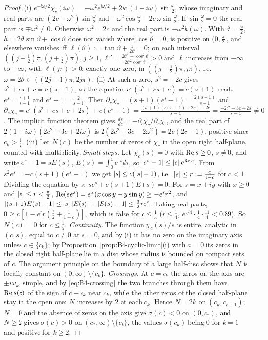 \begin{proof}
(i) $e^{-i\omega/2}\chi_c(i\omega)=-\omega^2e^{i\omega/2}+2ic\,(1+i\omega)\sin\frac\omega2$, whose imaginary and real parts are $(2c-\omega^2)\sin\frac\omega2$ and $-\omega^2\cos\frac\omega2-2c\,\omega\sin\frac\omega2$. If $\sin\frac\omega2=0$ the real part is $\mp\omega^2\ne0$. Otherwise $\omega^2=2c$ and the real part is $-\omega^2h(\omega)$. With $\vartheta=\frac\omega2$, $h=2\vartheta\sin\vartheta+\cos\vartheta$ does not vanish where $\cos\vartheta=0$, is positive on $(0,\frac\pi2]$, and elsewhere vanishes iff $\ell(\vartheta):=\tan\vartheta+\frac1{2\vartheta}=0$; on each interval $((j-\frac12)\pi,(j+\frac12)\pi)$, $j\ge1$, $\ell'=\frac{2\vartheta^2-\cos^2\vartheta}{2\vartheta^2\cos^2\vartheta}>0$ and $\ell$ increases from $-\infty$ to $+\infty$, with $\ell(j\pi)>0$: exactly one zero, in $((j-\frac12)\pi,j\pi)$, i.e.\ $\omega=2\vartheta\in((2j-1)\pi,2j\pi)$.
(ii) At such a zero, $s^2=-2c$ gives $s^2+cs+c=c(s-1)$, so the equation $e^s(s^2+cs+c)=c(s+1)$ reads $e^s=\frac{s+1}{s-1}$ and $e^s-1=\frac2{s-1}$. Then $\partial_c\chi_c=(s+1)(e^s-1)=\frac{2(s+1)}{s-1}$ and $\partial_s\chi_c=e^s(s^2+cs+c+2s)+c(e^s-1)=\frac{(s+1)(c(s-1)+2s)+2c}{s-1}=\frac{-2c^2-3c+2s}{s-1}\ne0$. The implicit function theorem gives $\frac{ds}{dc}=-\partial_c\chi_c/\partial_s\chi_c$, and the real part of $2(1+i\omega)(2c^2+3c+2i\omega)$ is $2(2c^2+3c-2\omega^2)=2c(2c-1)$, positive since $c_k>\frac12$.
(iii) Let $N(c)$ be the number of zeros of $\chi_c$ in the open right half-plane, counted with multiplicity. \emph{Small steps.} Let $\chi_c(s)=0$ with $\operatorname{Re} s\ge0$, $s\ne0$, and write $e^s-1=sE(s)$, $E(s)=\int_0^1e^{\tau s}d\tau$, so $\left|e^s-1\right|\le\left|s\right|e^{\operatorname{Re} s}$. From $s^2e^s=-c(s+1)(e^s-1)$ we get $\left|s\right|\le c(\left|s\right|+1)$, i.e.\ $\left|s\right|\le r:=\frac c{1-c}$ for $c<1$. Dividing the equation by $s$: $se^s+c(s+1)E(s)=0$. For $s=x+iy$ with $x\ge0$ and $\left|s\right|\le r<\frac\pi2$, $\operatorname{Re}(se^s)=e^x(x\cos y-y\sin y)\ge-e^rr^2$, and $\left|(s+1)E(s)-1\right|\le\left|s\right|\left|E(s)\right|+\left|E(s)-1\right|\le\frac32re^r$. Taking real parts, $0\ge c\,[1-e^rr(\frac32+\frac1{1-c})]$, which is false for $c\le\frac15$ ($r\le\frac14$, $e^{1/4}\cdot\frac14\cdot\frac{11}4<0.89$). So $N(c)=0$ for $c\le\frac15$. \emph{Continuity.} The function $\chi_c(s)/s$ is entire, analytic in $(c,s)$, equal to $c\ne0$ at $s=0$, and by (i) it has no zero on the imaginary axis unless $c\in\{c_k\}$; by Proposition~\ref{prop:B4-cyclic-limit}(i) with $a=0$ its zeros in the closed right half-plane lie in a disc whose radius is bounded on compact sets of $c$. The argument principle on the boundary of a large half-disc shows that $N$ is locally constant on $(0,\infty)\setminus\{c_k\}$. \emph{Crossings.} At $c=c_k$ the zeros on the axis are $\pm i\omega_k$, simple, and by \eqref{eq:B4-crossing} the two branches through them have $\operatorname{Re} s(c)$ of the sign of $c-c_k$ near $c_k$, while the other zeros of the closed half-plane stay in the open one: $N$ increases by $2$ at each $c_k$. Hence $N=2k$ on $(c_k,c_{k+1})$; $N=0$ and the absence of zeros on the axis give $\sigma(c)<0$ on $(0,c_\ast)$, and $N\ge2$ gives $\sigma(c)>0$ on $(c_\ast,\infty)\setminus\{c_k\}$, the values $\sigma(c_k)$ being $0$ for $k=1$ and positive for $k\ge2$.
\end{proof}

